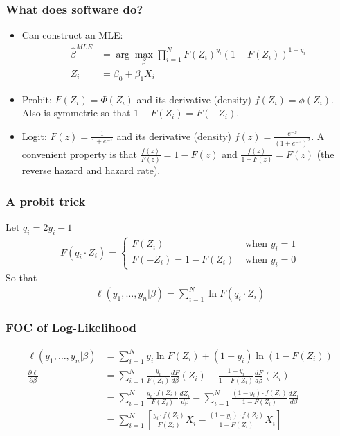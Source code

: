 \documentclass[aspectratio=169,11pt]{beamer}
\begin{document}
\begin{frame}
\frametitle{What does software do?}
\begin{itemize}
\item Can construct an MLE:
\begin{align*}
\hat{\beta}^{MLE} &= \arg \max_{\beta} \prod_{i=1}^N F(Z_i)^{y_i} (1-F(Z_i))^{1-{y_i} }\\
Z_i &= \beta_0 + \beta_1 X_i
\end{align*}
\item Probit: $F(Z_i) = \Phi(Z_i)$ and its derivative (density) $f(Z_i) = \phi(Z_i)$. \\
Also is \alert{symmetric} so that $1 - F(Z_i) = F(-Z_i)$.
\item Logit: $F(z) = \frac{1}{1+e^{-z}}$ and its derivative (density) $f(z) = \frac{e^{-z}}{(1+e^{-z})^2}$. A convenient property is that $\frac{f(z)}{F(z)} = 1 - F(z)$ and $\frac{f(z)}{1-F(z)} = F(z)$ (the \alert{reverse hazard} and \alert{hazard rate}).
\end{itemize}
\end{frame}

\begin{frame}
\frametitle{A probit trick}
Let $q_i = 2 y_i -1$
\begin{align*}
F(q_i \cdot Z_i) = 
\begin{cases}
F(Z_i)  &\mbox{ when } y_i=1 \\
F(-Z_i) = 1-F(Z_i)& \mbox{ when } y_i=0
\end{cases}
\end{align*}
So that 
\begin{align*}
\ell(y_1,\ldots, y_n | \beta) = \sum_{i=1}^N \ln F(q_i \cdot Z_i) 
\end{align*}
\end{frame}


\begin{frame}
\frametitle{FOC of Log-Likelihood}
\begin{align*}
\ell(y_1,\ldots,y_n | \beta) &= \sum_{i=1}^N y_i \ln F(Z_i) + (1-y_i) \ln(1- F(Z_i)) \\
\frac{\partial \ell }{\partial \beta} &= \sum_{i=1}^N \frac{y_i}{ F(Z_i)} \frac{ d F}{d \beta}(Z_i) - \frac{1-y_i}{1-F(Z_i)}  \frac{ d F}{d \beta} (Z_i)\\
 &= \sum_{i=1}^N \frac{y_i \cdot f(Z_i) }{ F(Z_i)} \frac{ d Z_i}{d \beta} -  \sum_{i=1}^N \frac{(1-y_i)\cdot f(Z_i) }{1-F(Z_i)} \frac{ d Z_i}{d \beta} \\
 &= \sum_{i=1}^N  \left[ \frac{y_i \cdot f(Z_i) }{ F(Z_i)} X_i -  \frac{(1-y_i)\cdot f(Z_i) }{1-F(Z_i)} X_i \right] 
\end{align*}
\end{frame}
\end{document}
